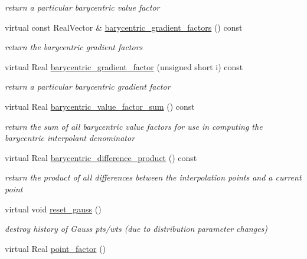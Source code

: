 \begin{DoxyCompactItemize}
\begin{DoxyCompactList}\small\item\em return a particular barycentric value factor \end{DoxyCompactList}\item 
virtual const Real\+Vector \& \hyperlink{classPecos_1_1BasisPolynomial_a1f77beaf45743dce80d8253b8f7a9394}{barycentric\+\_\+gradient\+\_\+factors} () const \label{classPecos_1_1BasisPolynomial_a1f77beaf45743dce80d8253b8f7a9394}

\begin{DoxyCompactList}\small\item\em return the barycentric gradient factors \end{DoxyCompactList}\item 
virtual Real \hyperlink{classPecos_1_1BasisPolynomial_a9cd03b3dfa402dcb120423d116e07d6b}{barycentric\+\_\+gradient\+\_\+factor} (unsigned short i) const \label{classPecos_1_1BasisPolynomial_a9cd03b3dfa402dcb120423d116e07d6b}

\begin{DoxyCompactList}\small\item\em return a particular barycentric gradient factor \end{DoxyCompactList}\item 
virtual Real \hyperlink{classPecos_1_1BasisPolynomial_ad36b23949c632dd0a6784f82f90050e4}{barycentric\+\_\+value\+\_\+factor\+\_\+sum} () const \label{classPecos_1_1BasisPolynomial_ad36b23949c632dd0a6784f82f90050e4}

\begin{DoxyCompactList}\small\item\em return the sum of all barycentric value factors for use in computing the barycentric interpolant denominator \end{DoxyCompactList}\item 
virtual Real \hyperlink{classPecos_1_1BasisPolynomial_ae0b1d51779230f3ce9fe3d7c4fc14198}{barycentric\+\_\+difference\+\_\+product} () const \label{classPecos_1_1BasisPolynomial_ae0b1d51779230f3ce9fe3d7c4fc14198}

\begin{DoxyCompactList}\small\item\em return the product of all differences between the interpolation points and a current point \end{DoxyCompactList}\item 
virtual void \hyperlink{classPecos_1_1BasisPolynomial_ad6115367af3811a5c75acbe340f04e58}{reset\+\_\+gauss} ()
\begin{DoxyCompactList}\small\item\em destroy history of Gauss pts/wts (due to distribution parameter changes) \end{DoxyCompactList}\item 
virtual Real \hyperlink{classPecos_1_1BasisPolynomial_ae2d76fe489a1633b6854399565692131}{point\+\_\+factor} ()\label{classPecos_1_1BasisPolynomial_ae2d76fe489a1633b6854399565692131}


\end{DoxyCompactItemize}
